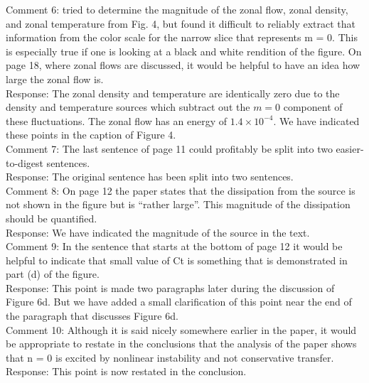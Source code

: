 \documentclass[12pt]{article}
\begin{document}
Comment 6:      tried to determine the magnitude of the zonal flow, zonal density, and zonal
temperature from Fig. 4, but found it difficult to reliably extract that information from the
color scale for the narrow slice that represents m = 0. This is especially true if one is
looking at a black and white rendition of the figure. On page 18, where zonal flows are
discussed, it would be helpful to have an idea how large the zonal flow is. \\

Response: The zonal density and temperature are identically zero due to the density and temperature sources which subtract out the $m=0$ component of these fluctuations. The zonal flow has an energy
of $1.4 \times 10^{-4}$. We have indicated these points in the caption of Figure 4. \\

Comment 7:   The last sentence of page 11 could profitably be split into two easier-to-digest sentences. \\

Response: The original sentence has been split into two sentences. \\

Comment 8:   On page 12 the paper states that the dissipation from the source is not shown in the
figure but is “rather large”. This magnitude of the dissipation should be quantified. \\

Response: We have indicated the magnitude of the source in the text. \\

Comment 9:   In the sentence that starts at the bottom of page 12 it would be helpful to indicate that
small value of Ct is something that is demonstrated in part (d) of the figure. \\

Response: This point is made two paragraphs later during the discussion of Figure 6d. But we have added a small clarification of this point near the end of the paragraph that discusses Figure 6d. \\

Comment 10:   Although it is said nicely somewhere earlier in the paper, it would be appropriate to
restate in the conclusions that the analysis of the paper shows that n = 0 is excited by
nonlinear instability and not conservative transfer. \\

Response: This point is now restated in the conclusion. \\
\end{document}
